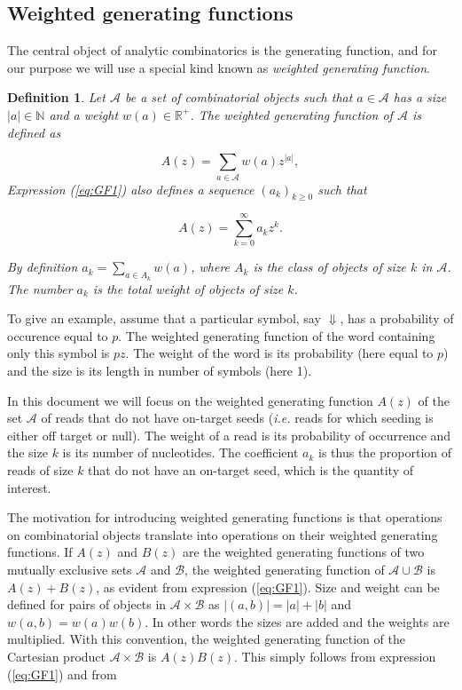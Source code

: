 \documentclass{article}
\newtheorem{definition}{Definition}
\begin{document}
\subsection{Weighted generating functions}

The central object of analytic combinatorics is the generating function,
and for our purpose we will use a special kind known as \emph{weighted
generating function}.

\begin{definition}
\label{def:GF}
Let $\mathcal{A}$ be a set of combinatorial objects such that $a \in
\mathcal{A}$ has a size $|a| \in \mathbb{N}$ and a weight $w(a) \in
\mathbb{R}^+$. The weighted generating function of $\mathcal{A}$ is
defined as

\begin{equation}
\label{eq:GF1}
A(z) = \sum_{a \in \mathcal{A}} w(a) z^{|a|},
\end{equation}
Expression (\ref{eq:GF1}) also defines a sequence $(a_k)_{k \geq 0}$ such
that 

\begin{equation*}
A(z) = \sum_{k=0}^\infty a_k z^k.
\end{equation*}

By definition $a_k = \sum_{a \in A_k}w(a)$, where $A_k$ is the class of
objects of size $k$ in $\mathcal{A}$. The number $a_k$ is the
total weight of objects of size $k$.
\end{definition}

To give an example, assume that a particular symbol, say $\Downarrow$, has
a probability of occurence equal to $p$. The weighted generating function
of the word containing only this symbol is $pz$. The weight of the word is
its probability (here equal to $p$) and the size is its length in number
of symbols (here 1).

In this document we will focus on the weighted generating function $A(z)$
of the set $\mathcal{A}$ of reads that do not have on-target seeds
(\textit{i.e.} reads for which seeding is either off target or null). The
weight of a read is its probability of occurrence and the size $k$ is its
number of nucleotides. The coefficient $a_k$ is thus the proportion of
reads of size $k$ that do not have an on-target seed, which is the
quantity of interest.

The motivation for introducing weighted generating functions is that
operations on combinatorial objects translate into operations on their
weighted generating functions. If $A(z)$ and $B(z)$ are the weighted
generating functions of two mutually exclusive sets $\mathcal{A}$ and
$\mathcal{B}$, the weighted generating function of $\mathcal{A} \cup
\mathcal{B}$ is $A(z) + B(z)$, as evident from expression (\ref{eq:GF1}).
Size and weight can be defined for pairs of objects in $\mathcal{A} \times
\mathcal{B}$ as $|(a,b)| = |a| + |b|$ and $w(a,b) = w(a)w(b)$. In other
words the sizes are added and the weights are multiplied.  With this
convention, the weighted generating function of the Cartesian product
$\mathcal{A} \times \mathcal{B}$ is $A(z)B(z)$. This simply follows from
expression (\ref{eq:GF1}) and from
\end{document}
